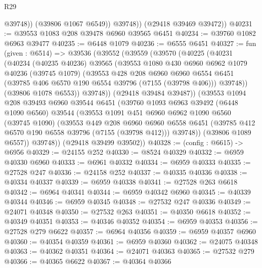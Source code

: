 \begin{lexlean}{R29}
\begin{coremodule}
                @39748))
            (@39806 @1067 @6549))
          @39748))
      (@29418 @39469 @39472))
@40231 := @39553 @1083 @208 @39478 @6960 @39565 @6451
@40234 := @39760 @1082 @6963 @39477
@40235 := @6448 @1079
@40236 := @6555 @6451
@40327 := fun (given : @6514) =>
  @39536
    (@39552
      (@39559
        (@39570
          (@40225
            (@40231
              (@40234
                (@40235 @40236)
                @39565
                (@39553
                  @1080
                  @430
                  @6960
                  @6962
                  @1079
                  @40236
                  (@39745 @1079)
                  (@39553
                    @428
                    @208
                    @6960
                    @6960
                    @6554
                    @6451
                    (@39785 @406 @6570 @190 @6554 @39796 (@7155 (@39798 @406)))
                    @39748))
                (@39806 @1078 @6553))
              @39748))
          (@29418 @39484 @39487))
        (@39553
          @1094
          @208
          @39493
          @6960
          @39544
          @6451
          (@39760
            @1093
            @6963
            @39492
            (@6448 @1090 @6560)
            @39544
            (@39553
              @1091
              @451
              @6960
              @6962
              @1090
              @6560
              (@39745 @1090)
              (@39553
                @449
                @208
                @6960
                @6960
                @6558
                @6451
                (@39785 @412 @6570 @190 @6558 @39796 (@7155 (@39798 @412)))
                @39748))
            (@39806 @1089 @6557))
          @39748))
      (@29418 @39499 @39502))
@40328 := (config : @6615) -> @6956
@40329 := @24155 @252
@40330 := @8524 @40329
@40332 := @6959 @40330 @6960
@40333 := @6961 @40332
@40334 := @6959 @40333
@40335 := @27528 @247
@40336 := @24158 @252
@40337 := @40335 @40336
@40338 := @40334 @40337
@40339 := @6959 @40338
@40341 := @27528 @263 @6618
@40342 := @6964 @40341
@40344 := @6959 @40342 @6960
@40345 := @40339 @40344
@40346 := @6959 @40345
@40348 := @27532 @247 @40336
@40349 := @24071 @40348
@40350 := @27532 @263
@40351 := @40350 @6618
@40352 := @40349 @40351
@40353 := @40346 @40352
@40354 := @6959 @40353
@40356 := @27528 @279 @6622
@40357 := @6964 @40356
@40359 := @6959 @40357 @6960
@40360 := @40354 @40359
@40361 := @6959 @40360
@40362 := @24075 @40348
@40363 := @40362 @40351
@40364 := @24071 @40363
@40365 := @27532 @279
@40366 := @40365 @6622
@40367 := @40364 @40366

\end{coremodule}
\end{lexlean}
